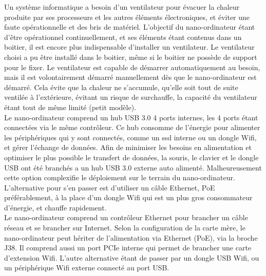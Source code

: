 \noindent Un système informatique a besoin d'un ventilateur pour évacuer la chaleur produite par ses processeurs et les autres éléments électroniques, et éviter une faute opérationnelle et des bris de matériel. L'objectif du nano-ordinateur étant d'être opérationnel continuellement, et ses éléments étant contenus dans un boitier, il est encore plus indispensable d'installer un ventilateur. Le ventilateur choisi a pu être installé dans le boitier, même si le boitier ne possède de support pour le fixer. Le ventilateur est capable de démarrer automatiquement au besoin, mais il est volontairement démarré manuellement dès que le nano-ordinateur est démarré. Cela évite que la chaleur ne s'accumule, qu'elle soit tout de suite ventilée à l'extérieure, évitant un risque de surchauffe, la capacité du ventilateur étant tout de même limité (petit modèle).
\vspace{0.5\baselineskip}
\\
\noindent Le nano-ordinateur comprend un hub USB 3.0 4 ports internes, les 4 ports étant connectées via le même contrôleur. Ce hub consomme de l'énergie pour alimenter les périphériques qui y sont connectés, comme un \acrshort{ssd} interne ou un dongle Wifi, et gérer l’échange de données. Afin de minimiser les besoins en alimentation et optimiser le plus possible le transfert de données, la souris, le clavier et le dongle USB ont été branchés a un hub USB 3.0 externe auto alimenté. Malheureusement cette option complexifie le déploiement sur le terrain du nano-ordinateur. L'alternative pour s'en passer est d'utiliser un câble Ethernet, PoE préférablement, à la place d'un dongle Wifi qui est un plus gros consommateur d'énergie, et chauffe rapidement.
\vspace{0.5\baselineskip}
\\
\noindent Le nano-ordinateur comprend un contrôleur Ethernet pour brancher un câble réseau et se brancher sur Internet. Selon la configuration de la carte mère, le nano-ordinateur peut hériter de l'alimentation via Ethernet (PoE), via la broche J38. Il comprend aussi un port PCIe interne qui permet de brancher une carte d'extension Wifi. L'autre alternative étant de passer par un dongle USB Wifi, ou un périphérique Wifi externe connecté au port USB. 
